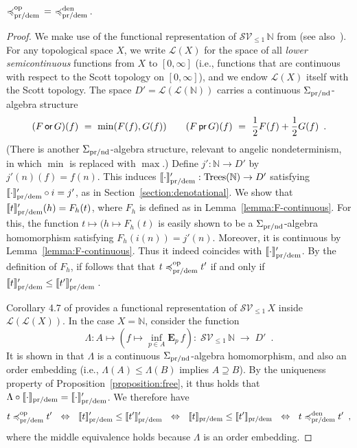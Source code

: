 \begin{lemma}
${\preccurlyeq^{\text{op}}_{\text{pr/dem}}} \, = \,\, \preccurlyeq^{\text{den}}_{\text{pr/dem}}\,$.
\end{lemma}
\begin{proof}
We make use of the functional representation of $\mathcal{S}\mathcal{V}_{\leq 1}\, \mathbb{N}$ from \cite{KeimelP2016} (see also~\cite{JGL-mscs16}). 
For any topological space $X$, we write $\mathcal{L}(X)$ for the space of all
\emph{lower semicontinuous} functions from $X$ to $[0,\infty]$ (i.e., functions that are continuous with respect to the Scott topology on $[0,\infty]$), and we endow $\mathcal{L}(X)$ itself with the Scott topology. The space
$D' = \mathcal{L}(\mathcal{L}(\mathbb{N}))$ carries a continuous $\Sigma_{\text{pr/nd}}$-algebra structure
\[
(F \operatorname{\textsf{or}} G)(f) ~ = ~ \min(F(f), G(f)) \qquad 
(F \operatorname{\textsf{pr}} G)(f) ~ = ~ \frac{1}{2}F(f) + \frac{1}{2}G(f) \enspace .
\]
(There is another $\Sigma_{\text{pr/nd}}$-algebra structure, relevant to angelic nondeterminism, in which  $\min$ is replaced with $\max$.) Define $j' : \mathbb{N} \to D'$ by $j'(n)(f) = f(n)$. This induces $\llbracket \cdot \rrbracket'_{\text{pr/dem}} : \textnormal{Trees}(\mathbb{N}) \to D'$
satisfying  $\llbracket \cdot \rrbracket'_{\text{pr/dem}} \circ i = j'$, as in Section~\ref{section:denotational}.
We show that $\llbracket t \rrbracket'_{\text{pr/dem}} (h) = F_h (t)$, where $F_h$ is defined as in
Lemma~\ref{lemma:F-continuous}. For this, the function $t \mapsto (h \mapsto F_h (t)$ is easily shown to be a $\Sigma_{\text{pr/nd}}$-algebra homomorphism
satisfying $F_h(i(n)) = j'(n)$. Moreover, it is continuous by 
Lemma~\ref{lemma:F-continuous}. Thus it indeed coincides with 
$\llbracket \cdot \rrbracket'_{\text{pr/dem}}$. By the definition of $F_h$, if follows that that
$t \preccurlyeq^{\text{op}}_{\text{pr/dem}} t'$ if and only if 
$\llbracket t \rrbracket'_{\text{pr/dem}} \leq \llbracket t' \rrbracket'_{\text{pr/dem}} \,$.

Corollary 4.7 of \cite{KeimelP2016} provides a functional representation of 
$\mathcal{S}\mathcal{V}_{\leq 1}\, X$ inside $\mathcal{L}(\mathcal{L}(X))$. In the case $X = \mathbb{N}$, consider the function
\[
\Lambda : A \mapsto \left(f \mapsto \inf_{p \in A} 
  \mathbf{E}_p\, f 
\right) 
 : \; \mathcal{S}\mathcal{V}_{\leq 1}\, \mathbb{N} \;  \to \; D' \enspace .
\]
It is shown in  \cite{KeimelP2016} that $\Lambda$  is a continuous $\Sigma_{\text{pr/nd}}$-algebra homomorphism, and also an order embedding (i.e., $\Lambda(A) \leq \Lambda(B)$ implies $A \supseteq B$). 
By the uniqueness property of Proposition~\ref{proposition:free}, it thus holds that $\Lambda \circ \llbracket \cdot \rrbracket_{\text{pr/dem}} = \llbracket \cdot \rrbracket'_{\text{pr/dem}}$. We therefore have
\[
t \preccurlyeq^{\text{op}}_{\text{pr/dem}} t' ~~ \Leftrightarrow ~ ~
  \llbracket t \rrbracket'_{\text{pr/dem}} \leq \llbracket t' \rrbracket'_{\text{pr/dem}} 
   ~~ \Leftrightarrow ~ ~
   \llbracket t \rrbracket_{\text{pr/dem}} \leq \llbracket t' \rrbracket_{\text{pr/dem}} 
      ~ ~\Leftrightarrow ~ ~
  t \preccurlyeq^{\text{den}}_{\text{pr/dem}} t' \enspace ,
   \]
where the middle equivalence holds because $\Lambda$ is an order embedding.
\end{proof}

